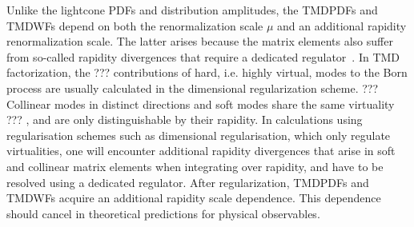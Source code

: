 \documentclass[prd,aps,twocolumn,preprintnumbers, showpacs, nofootinbib,superscriptaddress,notitlepage]{revtex4-1}
\newcommand\bl{\color{blue}}
\begin{document}
Unlike the  lightcone  PDFs and  distribution amplitudes,  the TMDPDFs and TMDWFs depend on both the renormalization scale $\mu$ and an additional rapidity renormalization scale. The latter arises because the matrix elements also suffer from {\bl so-called} rapidity divergences that require a dedicated regulator~\cite{Collins:1981uk,Becher:2010tm,Chiu:2011qc}.  In TMD factorization, the {\bl ??? contributions of hard, i.e. highly virtual,  modes to the Born process are usually calculated in} the dimensional regularization scheme. {\bl ??? Collinear modes in distinct  directions and soft modes share the same virtuality ???} , %
and are only distinguishable by their rapidity. In calculations using {\bl regularisation} schemes such as dimensional {\bl regularisation}, which only regulate virtualities, one will encounter additional rapidity divergences that arise in soft and collinear matrix elements when integrating {\bl over rapidity}, and have to be resolved using a dedicated regulator. After  {\bl regularization, TMDPDFs and TMDWFs} acquire an additional rapidity scale dependence. This dependence should cancel in theoretical predictions for  physical observables. 
\end{document}
